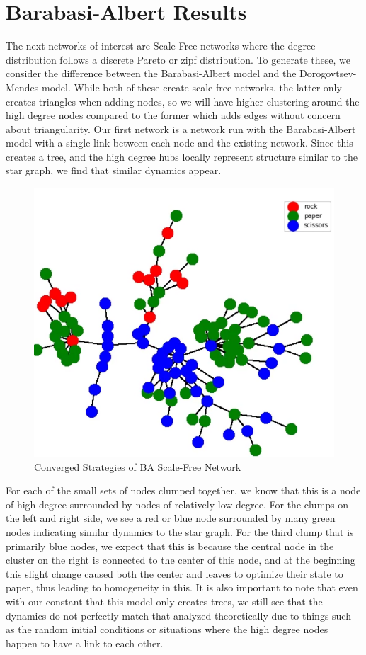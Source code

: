 \documentclass[letterpaper, 12 pt, conference]{ieeeconf}
\begin{document}
\section*{Barabasi-Albert Results}
The next networks of interest are Scale-Free networks where the degree distribution follows a discrete Pareto or zipf distribution. To generate these, we consider the difference between the Barabasi-Albert model and the Dorogovtsev-Mendes model. While both of these create scale free networks, the latter only creates triangles when adding nodes, so we will have higher clustering around the high degree nodes compared to the former which adds edges without concern about triangularity. Our first network is a network run with the Barabasi-Albert model with a single link between each node and the existing network. Since this creates a tree, and the high degree hubs locally represent structure similar to the star graph, we find that similar dynamics appear. 
\begin{figure}[ht]
    \centering
    \includegraphics[width=\columnwidth]{ba_net.png}
    \caption{Converged Strategies of BA Scale-Free Network}
    \label{fig:ba net}
\end{figure}

For each of the small sets of nodes clumped together, we know that this is a node of high degree surrounded by nodes of relatively low degree. For the clumps on the left and right side, we see a red or blue node surrounded by many green nodes indicating similar dynamics to the star graph. For the third clump that is primarily blue nodes, we expect that this is because the central node in the cluster on the right is connected to the center of this node, and at the beginning this slight change caused both the center and leaves to optimize their state to paper, thus leading to homogeneity in this. It is also important to note that even with our constant that this model only creates trees, we still see that the dynamics do not perfectly match that analyzed theoretically due to things such as the random initial conditions or situations where the high degree nodes happen to have a link to each other. 
\end{document}
